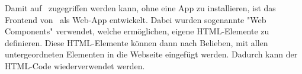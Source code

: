 \label{sec:webcomponents}

Damit auf \ZELIA\ zugegriffen werden kann, ohne eine App zu installieren, ist das Frontend von \ZELIA\ als Web-App entwickelt. Dabei wurden sogenannte "Web Components" verwendet, welche ermöglichen, eigene HTML-Elemente zu definieren. Diese HTML-Elemente können dann nach Belieben, mit allen untergeordneten Elementen in die Webseite eingefügt werden. Dadurch kann der HTML-Code wiederverwendet werden.


\pagebreak
